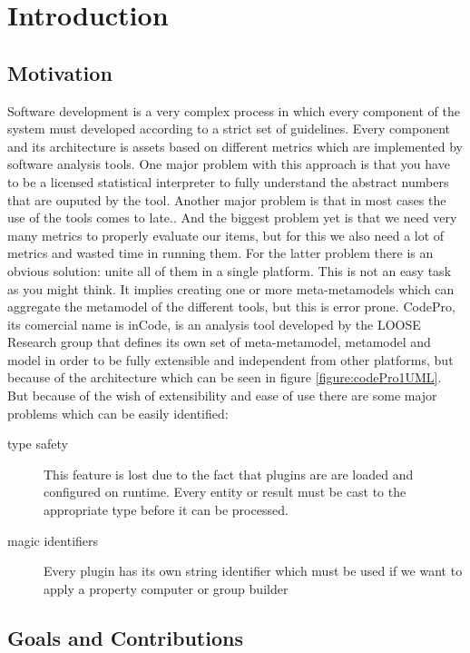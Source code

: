 \chapter{Introduction}\label{ch:1}

\section{Motivation}
	Software development is a very complex process in which every component of the
system must developed according to a strict set of guidelines. Every component
and its architecture is assets based on different metrics which are implemented
by software analysis tools. One major problem with this approach is that you
have to be a licensed statistical interpreter to fully understand the abstract
numbers that are ouputed by the tool. Another major problem is that in most
cases the use of the tools comes to late.\cite{tools:inCode}. And the biggest
problem yet is that we need very many metrics to properly evaluate our items,
but for this we also need a lot of metrics and wasted time in running them.
	For the latter problem there is an obvious solution: unite all of them
in a single platform. This is not an easy task as you might think. It implies
creating one or more meta-metamodels which can aggregate the metamodel of the
different tools, but this is error prone.
	CodePro, its comercial name is inCode\cite{site:inCode}, is an analysis tool
developed by the LOOSE Research group \cite{tools:inCode} that defines its own 
set of meta-metamodel, metamodel and model in order to be fully extensible and
independent from other platforms, but because of the architecture which can be 
seen in figure \ref{figure:codePro1UML}. But because of the wish of
extensibility and ease of use there are some major problems which can be easily
identified:
		\begin{description}
		\item[type safety] This feature is lost due to the fact that plugins are
are loaded and configured on runtime. Every entity or result must be cast to the
appropriate type before it can be processed. 
		\item[magic identifiers] Every plugin has its own string identifier which 
must be used if we want to apply a property computer or group builder  
		\end{description}
	
\section{Goals and Contributions}
	

